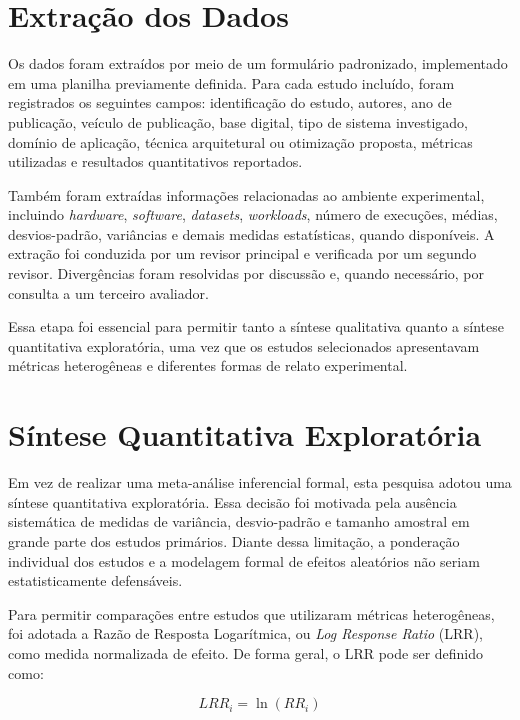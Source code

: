 \section{Extração dos Dados}
\label{sec:rsl-extracao}

Os dados foram extraídos por meio de um formulário padronizado, implementado em uma planilha previamente definida. Para cada estudo incluído, foram registrados os seguintes campos: identificação do estudo, autores, ano de publicação, veículo de publicação, base digital, tipo de sistema investigado, domínio de aplicação, técnica arquitetural ou otimização proposta, métricas utilizadas e resultados quantitativos reportados.

Também foram extraídas informações relacionadas ao ambiente experimental, incluindo \textit{hardware}, \textit{software}, \textit{datasets}, \textit{workloads}, número de execuções, médias, desvios-padrão, variâncias e demais medidas estatísticas, quando disponíveis. A extração foi conduzida por um revisor principal e verificada por um segundo revisor. Divergências foram resolvidas por discussão e, quando necessário, por consulta a um terceiro avaliador.

Essa etapa foi essencial para permitir tanto a síntese qualitativa quanto a síntese quantitativa exploratória, uma vez que os estudos selecionados apresentavam métricas heterogêneas e diferentes formas de relato experimental.

\section{Síntese Quantitativa Exploratória}
\label{sec:rsl-sintese-quantitativa}

Em vez de realizar uma meta-análise inferencial formal, esta pesquisa adotou uma síntese quantitativa exploratória. Essa decisão foi motivada pela ausência sistemática de medidas de variância, desvio-padrão e tamanho amostral em grande parte dos estudos primários. Diante dessa limitação, a ponderação individual dos estudos e a modelagem formal de efeitos aleatórios não seriam estatisticamente defensáveis.

Para permitir comparações entre estudos que utilizaram métricas heterogêneas, foi adotada a Razão de Resposta Logarítmica, ou \textit{Log Response Ratio} (LRR), como medida normalizada de efeito. De forma geral, o LRR pode ser definido como:

\begin{equation}
LRR_i = \ln(RR_i)
\label{eq:lrr}
\end{equation}

